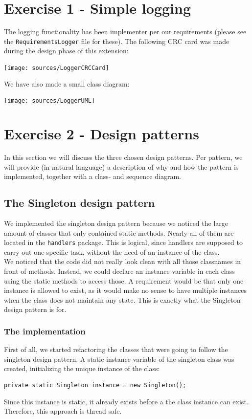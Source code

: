 \documentclass[a4paper,11pt,report]{scrartcl}
\begin{document}
\newpage\section{Exercise 1 - Simple logging}
The logging functionality has been implementer per our requirements (please see
the \texttt{RequirementsLogger} file for these). The following CRC card was made
during the design phase of this extension:\\

\centerline{\texttt{[image: sources/LoggerCRCCard]}}

We have also made a small class diagram:\\

\newpage\centerline{\texttt{[image: sources/LoggerUML]}}

\newpage\section{Exercise 2 - Design patterns}
In this section we will discuss the three chosen design patterns. Per pattern,
we will provide (in natural language) a description of why and how the pattern
is implemented, together with a class- and sequence diagram.

\subsection{The Singleton design pattern}
We implemented the singleton design pattern because we noticed the large amount
of classes that only contained static methods. Nearly all of them are located in
the \texttt{handlers} package. This is logical, since handlers are supposed to carry out
one specific task, without the need of an instance of the class.\\

We noticed that the code did not really look clean with all those classnames in
front of methods. Instead, we could declare an instance variable in each class
using the static methods to access those. A requirement would be that only one
instance is allowed to exist, as it would make no sense to have multiple
instances when the class does not maintain any state. This is exactly what the
Singleton design pattern is for.

\subsubsection{The implementation}
First of all, we started refactoring the classes that were going to follow the
singleton design pattern. A static instance variable of the singleton class was
created, initializing the unique instance of the class:
\begin{verbatim}
private static Singleton instance = new Singleton();
\end{verbatim}
\newpage Since this instance is static, it already exists before a the class instance
can exist. Therefore, this approach is thread safe.\\
\end{document}
